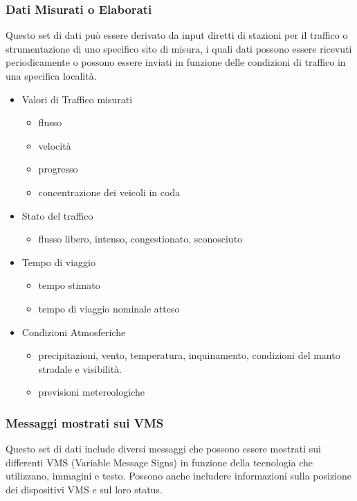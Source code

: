 \subsubsection{Dati Misurati o Elaborati}
Questo set di dati può essere derivato da input diretti di stazioni per il traffico o strumentazione di uno specifico sito di misura, i quali dati possono essere ricevuti periodicamente o possono essere inviati in funzione delle condizioni di traffico in una specifica località.
\begin{itemize}
	\item Valori di Traffico misurati
	\begin{itemize}
		\item flusso
		\item velocità
		\item progresso
		\item concentrazione dei veicoli in coda		
	\end{itemize}
	\item Stato del traffico
	\begin{itemize}
		\item flusso libero, intenso, congestionato, sconosciuto
	\end{itemize}
	\item Tempo di viaggio
	\begin{itemize}
		\item tempo stimato
		\item tempo di viaggio nominale atteso
	\end{itemize}
	\item Condizioni Atmosferiche
	\begin{itemize}
		\item precipitazioni, vento, temperatura, inquinamento, condizioni del manto stradale e visibilità.
		\item previsioni metereologiche
	\end{itemize}
\end{itemize}

\subsubsection{Messaggi mostrati sui VMS}
Questo set di dati include diversi messaggi che possono essere mostrati sui differenti VMS (Variable Message Signs) in funzione della tecnologia che utilizzano, immagini e testo. Possono anche includere informazioni sulla posizione dei dispositivi VMS e sul loro status.


